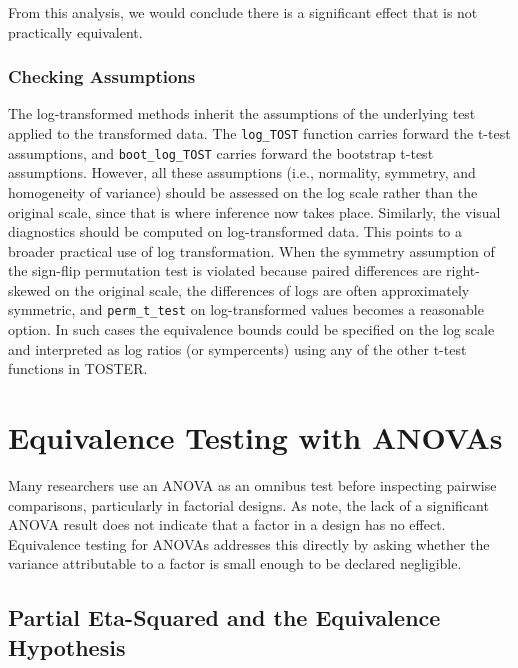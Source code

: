\documentclass[]{interact}
\theoremstyle{plain}%
\theoremstyle{definition}
\theoremstyle{remark}
\begin{document}
From this analysis, we would conclude there is a significant effect that
is not practically equivalent.

\subsubsection{Checking Assumptions}\label{checking-assumptions-7}

The log-transformed methods inherit the assumptions of the underlying
test applied to the transformed data. The \texttt{log\_TOST} function
carries forward the t-test assumptions, and \texttt{boot\_log\_TOST}
carries forward the bootstrap t-test assumptions. However, all these
assumptions (i.e., normality, symmetry, and homogeneity of variance)
should be assessed on the log scale rather than the original scale,
since that is where inference now takes place. Similarly, the visual
diagnostics should be computed on log-transformed data. This points to a
broader practical use of log transformation. When the symmetry
assumption of the sign-flip permutation test is violated because paired
differences are right-skewed on the original scale, the differences of
logs are often approximately symmetric, and \texttt{perm\_t\_test} on
log-transformed values becomes a reasonable option. In such cases the
equivalence bounds could be specified on the log scale and interpreted
as log ratios (or sympercents) using any of the other t-test functions
in TOSTER.

\newpage

\section{Equivalence Testing with
ANOVAs}\label{equivalence-testing-with-anovas}

Many researchers use an ANOVA as an omnibus test before inspecting
pairwise comparisons, particularly in factorial designs. As
\citet{Campbell_2021} note, the lack of a significant ANOVA result does
not indicate that a factor in a design has no effect. Equivalence
testing for ANOVAs addresses this directly by asking whether the
variance attributable to a factor is small enough to be declared
negligible.

\subsection{Partial Eta-Squared and the Equivalence
Hypothesis}\label{partial-eta-squared-and-the-equivalence-hypothesis}
\end{document}
